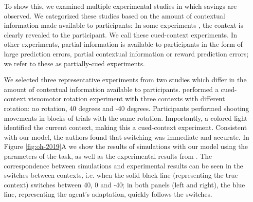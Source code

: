 \documentclass[a4paper,doc,floatsintext,natbib]{apa6}%
\def \fref #1{Figure \ref{#1}}     %
\begin{document}
To show this, we examined multiple experimental studies in which savings are observed. We categorized these studies based on the amount of contextual information made available to participants: In some experiments \citep[e.g.][]{Kim_Neural_2015,Lee_Dual_2009}, the context is clearly revealed to the participant. We call these cued-context experiments. In other experiments, partial information is available to participants \citep[e.g.][]{Davidson_Scaling_2004,Zarahn_Explaining_2008} in the form of large prediction errors, partial contextual information or reward prediction errors; we refer to these as partially-cued experiments.

We selected three representative experiments from two studies \citep{Kim_Neural_2015,Oh_Minimizing_2019} which differ in the amount of contextual information available to participants. \cite{Kim_Neural_2015} performed a cued-context visuomotor rotation experiment with three contexts with different rotation: no rotation, 40 degrees and -40 degrees. Participants performed shooting movements in blocks of trials with the same rotation. Importantly, a colored light identified the current context, making this a cued-context experiment. Consistent with our model, the authors found that switching was immediate and accurate. In \fref{fig:oh-2019}A we show the results of simulations with our model using the parameters of the task, as well as the experimental results from \cite{Kim_Neural_2015}. The correspondence between simulations and experimental results can be seen in the switches between contexts, i.e. when the solid black line (representing the true context) switches between 40, 0 and -40; in both panels (left and right), the blue line, representing the agent's adaptation, quickly follows the switches.
\end{document}
